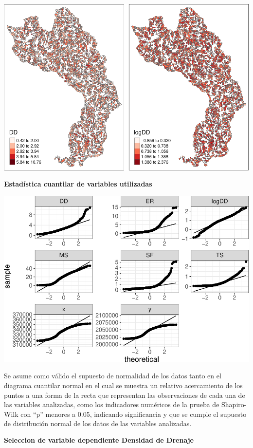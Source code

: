 \documentclass[11pt,]{article}
\begin{document}
\includegraphics{proyecto_f_files/figure-latex/unnamed-chunk-6-1.pdf}

\textbf{Estadística cuantilar de variables utilizadas}

\includegraphics{proyecto_f_files/figure-latex/unnamed-chunk-7-1.pdf}

Se asume como válido el supuesto de normalidad de los datos tanto en el
diagrama cuantilar normal en el cual se muestra un relativo acercamiento
de los puntos a una forma de la recta que representan las observaciones
de cada una de las variables analizadas, como los indicadores numéricos
de la prueba de Shapiro-Wilk con ``p'' menores a 0.05, indicando
significancia y que se cumple el supuesto de distribución normal de los
datos de las variables analizadas.

\textbf{Seleccion de variable dependiente Densidad de Drenaje}
\end{document}
